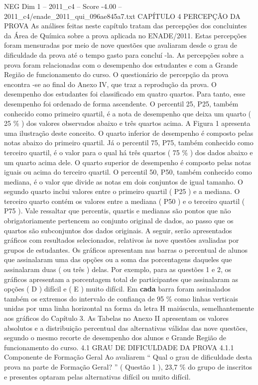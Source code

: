 \begin{textsample}{NEG Dim 1 – 2011\_c4 – Score -4.00 – 2011\_c4/enade\_2011\_qui\_096ae845a7.txt}  \label{ex:f1_neg_118}
CAPÍTULO 4 PERCEPÇÃO DA PROVA As análises feitas neste capítulo tratam das percepções dos concluintes da Área de Química sobre a prova aplicada no ENADE/2011.
Estas percepções foram mensuradas por meio de nove questões que avaliaram desde o grau de dificuldade da prova até o tempo gasto para concluí -la.
As percepções sobre a prova foram relacionadas com o desempenho dos estudantes e com a Grande Região de funcionamento do curso.
O questionário de percepção da prova encontra -se ao final do Anexo IV, que traz a reprodução da prova.
O desempenho dos estudantes foi classificado em quatro quartos.
Para tanto, esse desempenho foi ordenado de forma ascendente.
O percentil 25, P25, também conhecido como primeiro quartil, é a nota de desempenho que deixa um quarto ( 25 \% ) dos valores observados abaixo e três quartos acima.
A Figura 1 apresenta uma ilustração deste conceito.
O quarto inferior de desempenho é composto pelas notas abaixo do primeiro quartil.
Já o percentil 75, P75, também conhecido como terceiro quartil, é o valor para o qual há três quartos ( 75 \% ) dos dados abaixo e um quarto acima dele.
O quarto superior de desempenho é composto pelas notas iguais ou acima do terceiro quartil.
O percentil 50, P50, também conhecido como mediana, é o valor que divide as notas em dois conjuntos de igual tamanho.
O segundo quarto inclui valores entre o primeiro quartil ( P25 ) e a mediana.
O terceiro quarto contém os valores entre a mediana ( P50 ) e o terceiro quartil ( P75 ).
Vale ressaltar que percentis, quartis e medianas são pontos que não obrigatoriamente pertencem ao conjunto original de dados, ao passo que os quartos são subconjuntos dos dados originais.
A seguir, serão apresentados gráficos com resultados selecionados, relativos às nove questões avaliadas por grupos de estudantes.
Os gráficos apresentam nas barras o percentual de alunos que assinalaram uma das opções ou a soma das porcentagens daqueles que assinalaram duas ( ou três ) delas.
Por exemplo, para as questões 1 e 2, os gráficos apresentam a porcentagem total de participantes que assinalaram as opções ( D ) difícil e ( E ) muito difícil.
Em \textbf{cada} barra foram assinalados também os extremos do intervalo de confiança de 95 \% como linhas verticais unidas por uma linha horizontal na forma da letra H maiúscula, semelhantemente aos gráficos do Capítulo 3.
As Tabelas no Anexo II apresentam os valores absolutos e a distribuição percentual das alternativas válidas das nove questões, segundo o mesmo recorte de desempenho dos alunos e Grande Região de funcionamento do curso. 4.1 GRAU DE DIFICULDADE DA PROVA 4.1.1 Componente de Formação Geral Ao avaliarem “ Qual o grau de dificuldade desta prova na parte de Formação Geral? ” ( Questão 1 ), 23,7 \% do grupo de inscritos e presentes optaram pelas alternativas difícil ou muito difícil.

\end{textsample}
